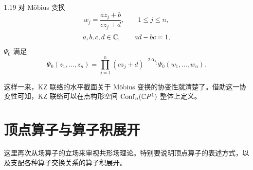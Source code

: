 \begin{proposition}{1.19}
  对 Möbius 变换
  \[
  w_j=\frac{az_j+b}{cz_j+d},\qquad 1\le j\le n,
  \]
  \[
  a,b,c,d\in\mathbb{C},\qquad ad-bc=1,
  \]
  $\Psi_0$ 满足
  \[
  \Psi_0(z_1,\dots,z_n)=\prod_{j=1}^{n}(cz_j+d)^{-2\Delta_{\lambda_j}}\Psi_0(w_1,\dots,w_n).
  \]
\end{proposition}


这样一来，KZ 联络的水平截面关于 Möbius 变换的协变性就清楚了。借助这一协变性可知，KZ 联络可以在点构形空间 $\operatorname{Conf}_n(\mathbb{C}P^1)$ 整体上定义。


\section{顶点算子与算子积展开}

这里再次从场算子的立场来审视共形场理论。特别要说明顶点算子的表述方式，以及支配各种算子交换关系的算子积展开。

